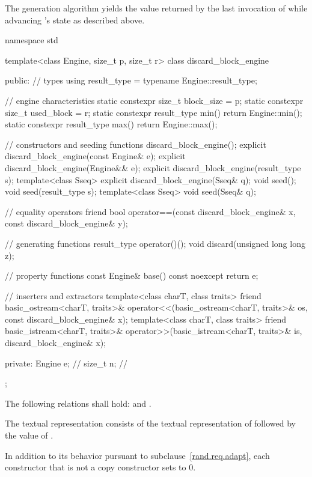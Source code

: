 \pnum
The generation algorithm
yields the value returned by the last invocation of 
 while advancing 's state as described above.

%
%
\begin{codeblock}
namespace std {
  template<class Engine, size_t p, size_t r>
  class discard_block_engine {
  public:
    // types
    using result_type = typename Engine::result_type;

    // engine characteristics
    static constexpr size_t block_size = p;
    static constexpr size_t used_block = r;
    static constexpr result_type min() { return Engine::min(); }
    static constexpr result_type max() { return Engine::max(); }

    // constructors and seeding functions
    discard_block_engine();
    explicit discard_block_engine(const Engine& e);
    explicit discard_block_engine(Engine&& e);
    explicit discard_block_engine(result_type s);
    template<class Sseq> explicit discard_block_engine(Sseq& q);
    void seed();
    void seed(result_type s);
    template<class Sseq> void seed(Sseq& q);

    // equality operators
    friend bool operator==(const discard_block_engine& x, const discard_block_engine& y);

    // generating functions
    result_type operator()();
    void discard(unsigned long long z);

    // property functions
    const Engine& base() const noexcept { return e; }

    // inserters and extractors
    template<class charT, class traits>
      friend basic_ostream<charT, traits>&
        operator<<(basic_ostream<charT, traits>& os, const discard_block_engine& x);
    template<class charT, class traits>
      friend basic_istream<charT, traits>&
        operator>>(basic_istream<charT, traits>& is, discard_block_engine& x);

  private:
    Engine e;   // \expos
    size_t n;   // \expos
  };
}
\end{codeblock}

\pnum
The following relations shall hold:
and
  .

\pnum
The textual representation
consists of
 the textual representation of 
followed by
 the value of .

\pnum
In addition to its behavior
pursuant to subclause~\ref{rand.req.adapt},
each constructor%
that is not a copy constructor
sets  to $0$.

